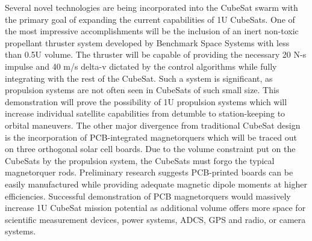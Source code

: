 Several novel technologies are being incorporated into the CubeSat
swarm with the primary goal of expanding the current capabilities of
1U CubeSats. One of the most impressive accomplishments will be the
inclusion of an inert non-toxic propellant thruster system developed
by Benchmark Space Systems with less than 0.5U volume. The thruster
will be capable of providing the necessary 20 N-s impulse and 40 m/s
delta-v dictated by the control algorithms while fully integrating
with the rest of the CubeSat. Such a system is significant, as
propulsion systems are not often seen in CubeSats of such small
size. This demonstration will prove the possibility of 1U propulsion
systems which will increase individual satellite capabilities from
detumble to station-keeping to orbital maneuvers. The other major
divergence from traditional CubeSat design is the incorporation of
PCB-integrated magnetorquers which will be traced out on three
orthogonal solar cell boards. Due to the volume constraint put on the
CubeSats by the propulsion system, the CubeSats must forgo the typical
magnetorquer rods. Preliminary research suggests PCB-printed boards
can be easily manufactured while providing adequate magnetic dipole
moments at higher efficiencies. Successful demonstration of PCB
magnetorquers would massively increase 1U CubeSat mission potential as
additional volume offers more space for scientific measurement
devices, power systems, ADCS, GPS and radio, or camera systems.
